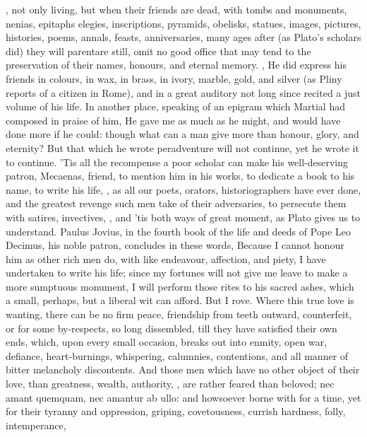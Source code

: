 {, not only living, but when
their friends are dead, with tombs and monuments, nenias, epitaphs
elegies, inscriptions, pyramids, obelisks, statues, images, pictures,
histories, poems, annals, feasts, anniversaries, many ages after (as
Plato's scholars did) they will parentare still, omit no good office
that may tend to the preservation of their names, honours, and eternal
memory. , \etc{} He did
express his friends in colours, in wax, in brass, in ivory, marble,
gold, and silver (as Pliny reports of a citizen in Rome), and in a
great auditory not long since recited a just volume of his life. In
another place, speaking of an epigram which Martial had composed
in praise of him, He gave me as much as he might, and would have
done more if he could: though what can a man give more than honour,
glory, and eternity? But that which he wrote peradventure will not
continue, yet he wrote it to continue. 'Tis all the recompense a poor
scholar can make his well-deserving patron, Mecaenas, friend, to
mention him in his works, to dedicate a book to his name, to write his
life, \etc{}, as all our poets, orators, historiographers have ever done,
and the greatest revenge such men take of their adversaries, to
persecute them with satires, invectives, \etc{}, and 'tis both ways of
great moment, as  Plato gives us to understand. Paulus Jovius, in
the fourth book of the life and deeds of Pope Leo Decimus, his noble
patron, concludes in these words, Because I cannot honour him as
other rich men do, with like endeavour, affection, and piety, I have
undertaken to write his life; since my fortunes will not give me leave
to make a more sumptuous monument, I will perform those rites to his
sacred ashes, which a small, perhaps, but a liberal wit can afford. But
I rove. Where this true love is wanting, there can be no firm peace,
friendship from teeth outward, counterfeit, or for some by-respects, so
long dissembled, till they have satisfied their own ends, which, upon
every small occasion, breaks out into enmity, open war, defiance,
heart-burnings, whispering, calumnies, contentions, and all manner of
bitter melancholy discontents. And those men which have no other object
of their love, than greatness, wealth, authority, \etc{}, are rather
feared than beloved; nec amant quemquam, nec amantur ab ullo: and
howsoever borne with for a time, yet for their tyranny and oppression,
griping, covetousness, currish hardness, folly, intemperance,
}
